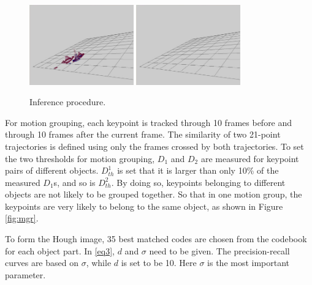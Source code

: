 \begin{figure}
\includegraphics[width=0.4\textwidth,bb=0 0 760 585]{inf7.jpg}
\includegraphics[width=0.4\textwidth,bb=0 0 760 585]{inf8.jpg}\\
\caption[Inference procedure]{Inference procedure.}
\label{fig:inf}
\end{figure}

For motion grouping, each keypoint is tracked through 10 frames before and through 10 frames after the current frame. The similarity of two 21-point trajectories is defined using only  the frames crossed by both trajectories. To set the two thresholds for motion grouping, $D_1$ and $D_2$ are  measured for keypoint pairs of different objects. $D^1_{th}$ is set that it is larger than only 10\% of the measured $D_1$s, and so is $D^2_{th}$. By doing so, keypoints belonging to different objects are not likely to be grouped together. So that in one motion group, the keypoints are very likely to belong to the same object, as shown in Figure \ref{fig:mgr}.

To form the Hough image, 35 best matched codes are chosen from the codebook for each object part. In \ref{eq3}, $d$ and $\sigma$ need to be given. The precision-recall curves are based on $\sigma$, while $d$ is set to be 10. Here $\sigma$ is the most important parameter.

